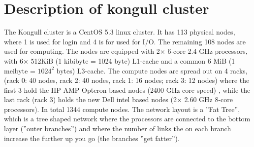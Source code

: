 \section{Description of kongull cluster}
The Kongull cluster is a CentOS 5.3 linux cluster. It has 113 physical nodes, 
where 1 is used for login and 4 is for used for I/O. The remaining 108 nodes are 
used for computing. The nodes are equipped with 2$\times$ 6-core 2.4 GHz processors, with 6$\times$ 512KiB 
(1 kibibyte = 1024 byte) L1-cache and a common 6 MiB (1 meibyte = $1024^2$ bytes) L3-cache.
The compute nodes are spread out on 4 racks, 
(rack 0: 40 nodes, rack 2: 40 nodes, rack 1: 16 nodes; rack 3: 12 nodes) 
where the first 3 hold the HP AMP Opteron based nodes (2400 GHz core speed) 
, while the last rack 
(rack 3) holds the new Dell intel based nodes (2$\times$ 2.60 GHz 8-core processors). In total 1344 compute nodes. The network layout is a ''Fat Tree'', which is a tree shaped network where the processors
are connected to the bottom layer (''outer branches'') and where the number of links the on each branch
increase the further up you go (the branches ''get fatter'').


